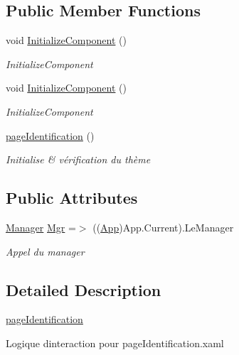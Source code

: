 \subsection*{Public Member Functions}
\begin{DoxyCompactItemize}
\item 
void \hyperlink{classnewPizza1_1_1pageIdentification_adfe48959ae9c294c657f21027deed65f}{Initialize\+Component} ()
\begin{DoxyCompactList}\small\item\em Initialize\+Component \end{DoxyCompactList}\item 
void \hyperlink{classnewPizza1_1_1pageIdentification_adfe48959ae9c294c657f21027deed65f}{Initialize\+Component} ()
\begin{DoxyCompactList}\small\item\em Initialize\+Component \end{DoxyCompactList}\item 
\hyperlink{classnewPizza1_1_1pageIdentification_a2c052fba1b9dbd52a6490af85f6edab1}{page\+Identification} ()
\begin{DoxyCompactList}\small\item\em Initialise \& vérification du thème \end{DoxyCompactList}\end{DoxyCompactItemize}
\subsection*{Public Attributes}
\begin{DoxyCompactItemize}
\item 
\hyperlink{classModele_1_1Manager}{Manager} \hyperlink{classnewPizza1_1_1pageIdentification_aa9d52ac6d4d3d35b3ce1947e999a5465}{Mgr} =$>$ ((\hyperlink{classnewPizza1_1_1App}{App})App.\+Current).Le\+Manager
\begin{DoxyCompactList}\small\item\em Appel du manager \end{DoxyCompactList}\end{DoxyCompactItemize}


\subsection{Detailed Description}
\hyperlink{classnewPizza1_1_1pageIdentification}{page\+Identification} 

Logique d\textquotesingle{}interaction pour page\+Identification.\+xaml 

